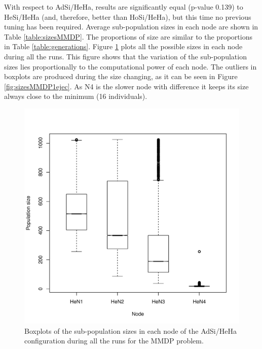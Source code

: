 With respect to AdSi/HeHa, %
results are significantly  equal (p-value 0.139) to HeSi/HeHa (and,
therefore, better than HoSi/HeHa), but this time no previous tuning
has been required.  Average sub-population sizes in each node are
shown in Table \ref{table:sizesMMDP}. The proportions of size are
similar to the proportions in Table \ref{table:generations}. Figure
\ref{fig:sizesMMDP} plots all the possible sizes in each node during
all the runs. This figure shows that the variation of the
sub-population sizes lies proportionally to the computational power of
each node. The outliers in boxplots are produced during the size
changing, as it can be seen in Figure \ref{fig:sizesMMDP1ejec}. As N4
is the slower node with difference it keeps its size always close to
the minimum (16 individuals). %

\begin{figure}
\centering
 \includegraphics[scale =0.4] {gfx/adaptiveresults/sizesMMDP.pdf}
\caption{Boxplots of the sub-population sizes in each node of the AdSi/HeHa configuration during all
  the runs for the MMDP problem.} 
\label{fig:sizesMMDP}
\end{figure}

